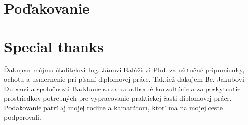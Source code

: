 \thispagestyle{empty}

\vspace*{\fill}

\ifx\FIITlagEN\undefined
\section*{Poďakovanie}
\else
\section*{Special thanks}
\fi

Ďakujem môjmu školiteľovi Ing. Jánovi Balážiovi Phd. za užitočné pripomienky, ochotu a usmernenie pri písaní diplomovej práce.
Taktiež ďakujem Bc. Jakubovi Dubcovi a spoločnosti Backbone s.r.o. za odborné konzultácie a za poskytnutie prostriedkov potrebných
pre vypracovanie praktickej časti diplomovej práce.
Poďakovanie patrí aj mojej rodine a kamarátom, ktorí ma na mojej ceste podporovali.

\emptypage
